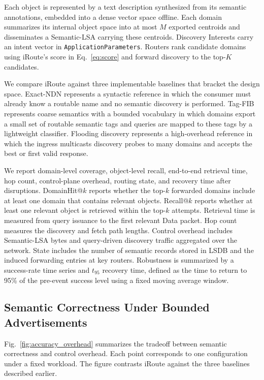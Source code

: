 \documentclass[journal]{IEEEtran}
\newcommand{\sysname}{iRoute}
\begin{document}
Each object is represented by a text description synthesized from its semantic annotations, embedded into a dense vector space offline.
Each domain summarizes its internal object space into at most $M$ exported centroids and disseminates a Semantic-LSA carrying these centroids.
Discovery Interests carry an intent vector in \texttt{ApplicationParameters}.
Routers rank candidate domains using \sysname{}'s score in Eq.~\ref{eq:score} and forward discovery to the top-$K$ candidates.

We compare \sysname{} against three implementable baselines that bracket the design space.
Exact-NDN represents a syntactic reference in which the consumer must already know a routable name and no semantic discovery is performed.
Tag-FIB represents coarse semantics with a bounded vocabulary in which domains export a small set of routable semantic tags and queries are mapped to these tags by a lightweight classifier.
Flooding discovery represents a high-overhead reference in which the ingress multicasts discovery probes to many domains and accepts the best or first valid response.

We report domain-level coverage, object-level recall, end-to-end retrieval time, hop count, control-plane overhead, routing state, and recovery time after disruptions.
DomainHit@$k$ reports whether the top-$k$ forwarded domains include at least one domain that contains relevant objects.
Recall@$k$ reports whether at least one relevant object is retrieved within the top-$k$ attempts.
Retrieval time is measured from query issuance to the first relevant Data packet.
Hop count measures the discovery and fetch path lengths.
Control overhead includes Semantic-LSA bytes and query-driven discovery traffic aggregated over the network.
State includes the number of semantic records stored in LSDB and the induced forwarding entries at key routers.
Robustness is summarized by a success-rate time series and $t_{95}$ recovery time, defined as the time to return to 95\% of the pre-event success level using a fixed moving average window.

\subsection{Semantic Correctness Under Bounded Advertisements}
\label{sec:eval_correctness}

Fig.~\ref{fig:accuracy_overhead} summarizes the tradeoff between semantic correctness and control overhead.
Each point corresponds to one configuration under a fixed workload.
The figure contrasts \sysname{} against the three baselines described earlier.
\end{document}
